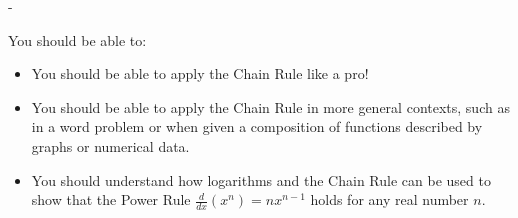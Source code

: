 \documentclass{article}
\makeatletter
\newlength{\tipmargin}
\renewenvironment{framed}{
  \setlength{\tipmargin}{\textwidth-\linewidth}
  \advance\@totalleftmargin-\tipmargin
  \def\FrameCommand{\hspace{\tipmargin}\fbox}%
  \advance\linewidth\tipmargin
  \MakeFramed {\advance\hsize-\width \FrameRestore}%
}
{\endMakeFramed}
\makeatother
\begin{document}
\begin{problemonly}
    \begin{framed}

You should be able to:

\begin{itemize}[topsep=0pt,partopsep=0pt,parsep=8pt,itemsep=0pt]

\item You should be able to apply the Chain Rule like a pro!

\item You should be able to apply the Chain Rule in more general contexts,
  such as in a word problem or when given a composition of functions
  described by graphs or numerical data.

\item You should understand how logarithms and the Chain Rule can be used
  to show that the Power Rule $\tfrac{d}{dx} \left( x^n \right) =
  nx^{n-1}$ holds for any real number $n$. 

\end{itemize} 

    \end{framed}
\end{problemonly}
\end{document}
